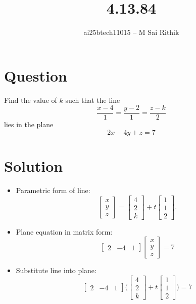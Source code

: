 \documentclass[12pt]{article}
\title{4.13.84}
\author{ai25btech11015 -- M Sai Rithik}
\date{}
\begin{document}
\maketitle

\section*{Question}
Find the value of \(k\) such that the line
\[
\frac{x-4}{1} = \frac{y-2}{1} = \frac{z-k}{2}
\]
lies in the plane
\[
2x - 4y + z = 7
\]

\section*{Solution}

\begin{itemize}
\item Parametric form of line:
\[
\begin{bmatrix} x\\y\\z \end{bmatrix} = 
\begin{bmatrix} 4\\2\\k \end{bmatrix} + t \begin{bmatrix} 1\\1\\2 \end{bmatrix}.
\]

\item Plane equation in matrix form:
\[
\begin{bmatrix} 2 & -4 & 1 \end{bmatrix} 
\begin{bmatrix} x\\y\\z \end{bmatrix} = 7
\]

\item Substitute line into plane:
\[
\begin{bmatrix} 2 & -4 & 1 \end{bmatrix} 
\Bigg( \begin{bmatrix} 4\\2\\k \end{bmatrix} + t \begin{bmatrix} 1\\1\\2 \end{bmatrix} \Bigg) = 7
\]


\end{itemize}
\end{document}
